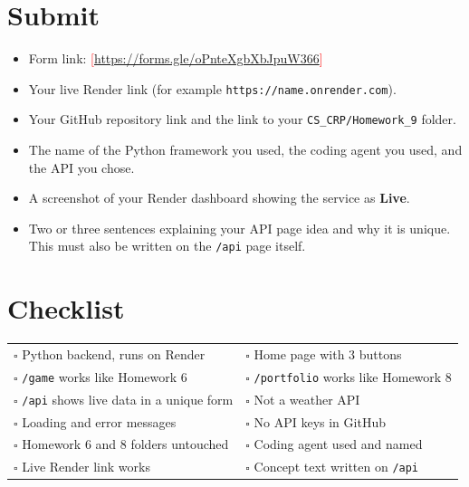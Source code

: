 \documentclass[11pt,a4paper]{article}
\begin{document}
\section{Submit}
\begin{itemize}
\item Form link: \textcolor{red}{[\url{https://forms.gle/oPnteXgbXbJpuW366}]}
\item Your live Render link (for example \texttt{https://name.onrender.com}).
\item Your GitHub repository link and the link to your \texttt{CS\_CRP/Homework\_9} folder.
\item The name of the Python framework you used, the coding agent you used, and the API you chose.
\item A screenshot of your Render dashboard showing the service as \textbf{Live}.
\item Two or three sentences explaining your API page idea and why it is unique. This must also be written on the \texttt{/api} page itself.
\end{itemize}

\section{Checklist}
\begin{tabularx}{\textwidth}{X X}
$\square$ Python backend, runs on Render & $\square$ Home page with 3 buttons\\
$\square$ \texttt{/game} works like Homework 6 & $\square$ \texttt{/portfolio} works like Homework 8\\
$\square$ \texttt{/api} shows live data in a unique form & $\square$ Not a weather API\\
$\square$ Loading and error messages & $\square$ No API keys in GitHub\\
$\square$ Homework 6 and 8 folders untouched & $\square$ Coding agent used and named\\
$\square$ Live Render link works & $\square$ Concept text written on \texttt{/api}\\
\end{tabularx}
\end{document}
